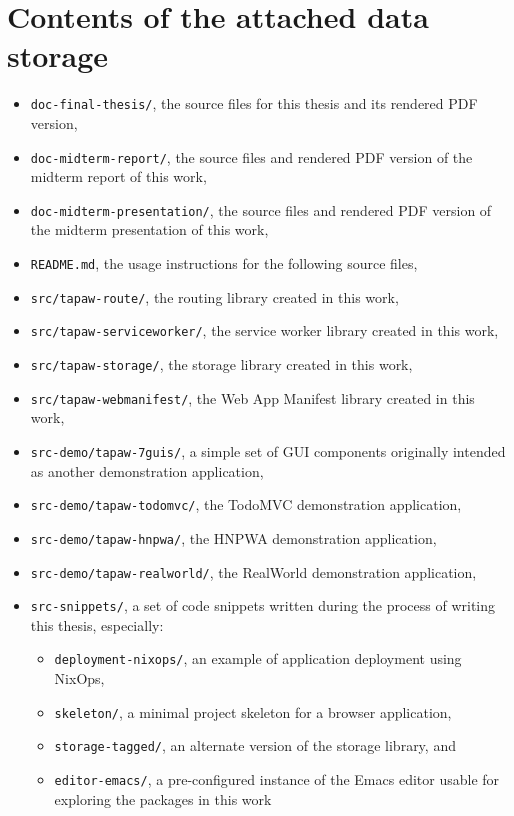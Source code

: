 \documentclass[english,zadani,odsaz]{fitthesis}
\begin{document}
\begin{flushleft}

\end{flushleft}
\iftwoside\cleardoublepage\fi

\appendix
\appendixpage
\iftwoside\cleardoublepage\fi

\startcontents[chapters]
\iftwoside\cleardoublepage\fi

\chapter{Contents of the attached data storage}
\label{sec:orgd5043bb}

\begin{itemize}
\item \texttt{doc-final-thesis/}, the source files for this thesis and its rendered PDF
version,
\item \texttt{doc-midterm-report/}, the source files and rendered PDF version of the midterm
report of this work,
\item \texttt{doc-midterm-presentation/}, the source files and rendered PDF version of the midterm
presentation of this work,
\item \texttt{README.md}, the usage instructions for the following source files,
\item \texttt{src/tapaw-route/}, the routing library created in this work,
\item \texttt{src/tapaw-serviceworker/}, the service worker library created in this work,
\item \texttt{src/tapaw-storage/}, the storage library created in this work,
\item \texttt{src/tapaw-webmanifest/}, the Web App Manifest library created in this work,
\item \texttt{src-demo/tapaw-7guis/}, a simple set of GUI components originally intended as
another demonstration application,
\item \texttt{src-demo/tapaw-todomvc/}, the TodoMVC demonstration application,
\item \texttt{src-demo/tapaw-hnpwa/}, the HNPWA demonstration application,
\item \texttt{src-demo/tapaw-realworld/}, the RealWorld demonstration application,
\item \texttt{src-snippets/}, a set of code snippets written during the process of writing
this thesis, especially:
\begin{itemize}
\item \texttt{deployment-nixops/}, an example of application deployment using NixOps,
\item \texttt{skeleton/}, a minimal project skeleton for a browser application,
\item \texttt{storage-tagged/}, an alternate version of the storage library, and
\item \texttt{editor-emacs/}, a pre-configured instance of the Emacs editor usable for
exploring the packages in this work
\end{itemize}
\end{itemize}
\end{document}
